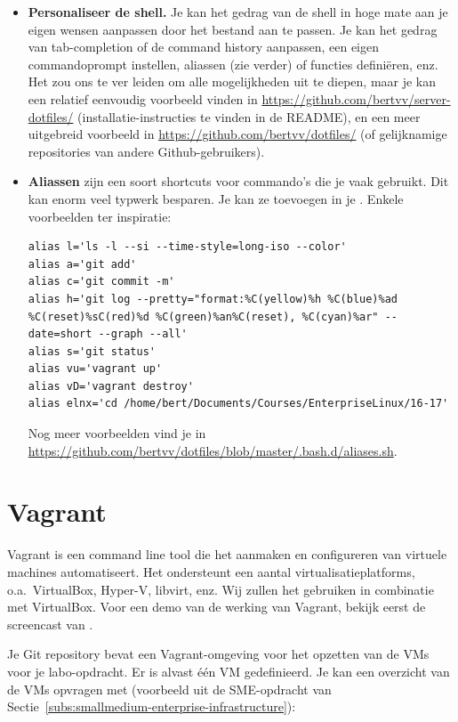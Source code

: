 \begin{itemize}
  \item \textbf{Personaliseer de shell.} Je kan het gedrag van de shell in hoge mate aan je eigen wensen aanpassen door het bestand  aan te passen. Je kan het gedrag van tab-completion of de command history aanpassen, een eigen commandoprompt instellen, aliassen (zie verder) of functies definiëren, enz. Het zou ons te ver leiden om alle mogelijkheden uit te diepen, maar je kan een relatief eenvoudig voorbeeld vinden in \url{https://github.com/bertvv/server-dotfiles/} (installatie-instructies te vinden in de README), en een meer uitgebreid voorbeeld in \url{https://github.com/bertvv/dotfiles/} (of gelijknamige repositories van andere Github-gebruikers).

  \item \textbf{Aliassen} zijn een soort shortcuts voor commando's die je vaak gebruikt. Dit kan enorm veel typwerk besparen. Je kan ze toevoegen in je . Enkele voorbeelden ter inspiratie:

    \begin{verbatim}
alias l='ls -l --si --time-style=long-iso --color'
alias a='git add'
alias c='git commit -m'
alias h='git log --pretty="format:%C(yellow)%h %C(blue)%ad %C(reset)%sC(red)%d %C(green)%an%C(reset), %C(cyan)%ar" --date=short --graph --all'
alias s='git status'
alias vu='vagrant up'
alias vD='vagrant destroy'
alias elnx='cd /home/bert/Documents/Courses/EnterpriseLinux/16-17'
\end{verbatim}

    Nog meer voorbeelden vind je in \url{https://github.com/bertvv/dotfiles/blob/master/.bash.d/aliases.sh}.
\end{itemize}

\section{Vagrant}
\label{sec:vagrant}

Vagrant is een command line tool die het aanmaken en configureren van virtuele machines automatiseert. Het ondersteunt een aantal virtualisatieplatforms, o.a.~VirtualBox, Hyper-V, libvirt, enz. Wij zullen het gebruiken in combinatie met VirtualBox. Voor een demo van de werking van Vagrant, bekijk eerst de screencast van \textcite{Weissig2014}.

Je Git repository bevat een Vagrant-omgeving voor het opzetten van de VMs voor je labo-opdracht. Er is alvast één VM gedefinieerd.  Je kan een overzicht van de VMs opvragen met (voorbeeld uit de SME-opdracht van Sectie~\ref{subs:smallmedium-enterprise-infrastructure}):

